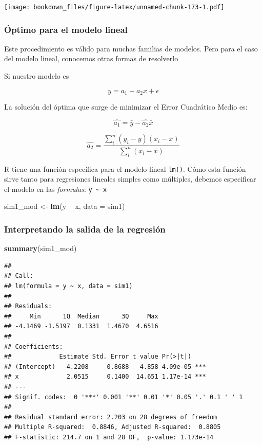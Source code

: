 \documentclass[]{book}
\newenvironment{Shaded}{\begin{snugshade}}{\end{snugshade}}
\newcommand{\DataTypeTok}[1]{\textcolor[rgb]{0.13,0.29,0.53}{#1}}
\newcommand{\KeywordTok}[1]{\textcolor[rgb]{0.13,0.29,0.53}{\textbf{#1}}}
\newcommand{\NormalTok}[1]{#1}
\newcommand{\OperatorTok}[1]{\textcolor[rgb]{0.81,0.36,0.00}{\textbf{#1}}}
\newcommand{\StringTok}[1]{\textcolor[rgb]{0.31,0.60,0.02}{#1}}
\begin{document}
\texttt{[image: bookdown\_files/figure-latex/unnamed-chunk-173-1.pdf]}

\hypertarget{optimo-para-el-modelo-lineal}{%
\subsubsection{Óptimo para el modelo lineal}\label{optimo-para-el-modelo-lineal}}

Este procedimiento es válido para muchas familias de modelos. Pero para el caso del modelo lineal, conocemos otras formas de resolverlo

Si nuestro modelo es

\[
y = a_1 + a_2x + \epsilon
\]

La solución del óptima que surge de minimizar el Error Cuadrático Medio es:

\[
\hat{a_1} = \bar{y} - \hat{a_2}\bar{x} 
\]

\[
\hat{a_2} = \frac{\sum_i^n (y_i -\bar{y})(x_i -\bar{x})}{\sum_i^n (x_i- \bar{x})}
\]

R tiene una función específica para el modelo lineal \texttt{lm()}. Cómo esta función sirve tanto para regresiones lineales simples como múltiples, debemos especificar el modelo en las \emph{formulas}: \texttt{y\ \textasciitilde{}\ x}

\begin{Shaded}
\begin{Highlighting}[]
\NormalTok{sim1_mod <-}\StringTok{ }\KeywordTok{lm}\NormalTok{(y }\OperatorTok{~}\StringTok{ }\NormalTok{x, }\DataTypeTok{data =}\NormalTok{ sim1)}
\end{Highlighting}
\end{Shaded}

\hypertarget{interpretando-la-salida-de-la-regresion}{%
\subsubsection{Interpretando la salida de la regresión}\label{interpretando-la-salida-de-la-regresion}}

\begin{Shaded}
\begin{Highlighting}[]
\KeywordTok{summary}\NormalTok{(sim1_mod)}
\end{Highlighting}
\end{Shaded}

\begin{verbatim}
## 
## Call:
## lm(formula = y ~ x, data = sim1)
## 
## Residuals:
##     Min      1Q  Median      3Q     Max 
## -4.1469 -1.5197  0.1331  1.4670  4.6516 
## 
## Coefficients:
##             Estimate Std. Error t value Pr(>|t|)    
## (Intercept)   4.2208     0.8688   4.858 4.09e-05 ***
## x             2.0515     0.1400  14.651 1.17e-14 ***
## ---
## Signif. codes:  0 '***' 0.001 '**' 0.01 '*' 0.05 '.' 0.1 ' ' 1
## 
## Residual standard error: 2.203 on 28 degrees of freedom
## Multiple R-squared:  0.8846, Adjusted R-squared:  0.8805 
## F-statistic: 214.7 on 1 and 28 DF,  p-value: 1.173e-14
\end{verbatim}
\end{document}
